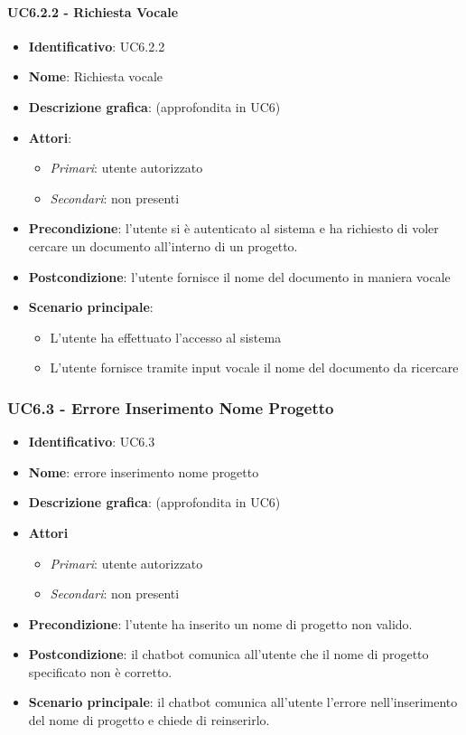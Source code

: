 \paragraph{UC6.2.2 - Richiesta Vocale}
\begin{itemize}
   \item \textbf{Identificativo}: UC6.2.2
   \item \textbf{Nome}: Richiesta vocale
   \item \textbf{Descrizione grafica}: (approfondita in UC6)
   \item \textbf{Attori}:
   \begin{itemize} 
       \item \textit{Primari}: utente autorizzato
       \item \textit{Secondari}: non presenti
   \end{itemize}
       \item \textbf{Precondizione}: l'utente si è autenticato al sistema e ha richiesto di voler cercare un documento all'interno di un progetto.
       \item \textbf{Postcondizione}: l'utente fornisce il nome del documento in maniera vocale
    \item \textbf{Scenario principale}: 
       \begin{itemize}
           \item L'utente ha effettuato l'accesso al sistema 
           \item L'utente fornisce tramite input vocale il nome del documento da ricercare
       \end{itemize}
\end{itemize}

\subsubsection{UC6.3 - Errore Inserimento Nome Progetto}
\begin{itemize}
    \item \textbf{Identificativo}: UC6.3
    \item \textbf{Nome}: errore inserimento nome progetto
    \item \textbf{Descrizione grafica}: (approfondita in UC6)
    \item \textbf{Attori}
 \begin{itemize} 
    \item \textit{Primari}: utente autorizzato
    \item \textit{Secondari}: non presenti
 \end{itemize}
 \item \textbf{Precondizione}: l'utente ha inserito un nome di progetto non valido.
 \item \textbf{Postcondizione}:  il chatbot comunica all'utente che il nome di progetto specificato non è corretto.
 \item \textbf{Scenario principale}: il chatbot comunica all'utente l'errore nell'inserimento del nome di progetto e chiede di reinserirlo.
\end{itemize}
